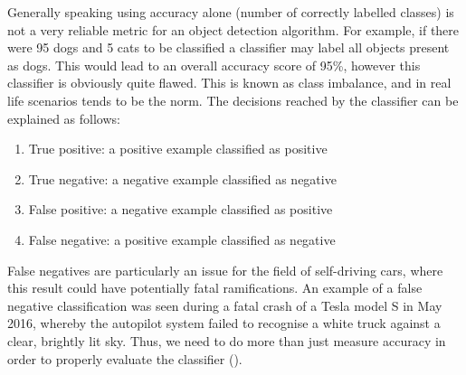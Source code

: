 \documentclass[12pt]{report}
\begin{document}
\begin{flushleft}
Generally speaking using accuracy alone (number of correctly labelled classes) is not a very reliable metric for an object detection algorithm. For example, if there were 95 dogs and 5 cats to be classified a classifier may label all objects present as dogs. This would lead to an overall accuracy score of 95\%, however this classifier is obviously quite flawed. This is known as class imbalance, and in real life scenarios tends to be the norm. The decisions reached by the classifier can be explained as follows:

\begin{enumerate}
  \item True positive: a positive example classified as positive
  \item True negative: a negative example classified as negative
  \item False positive: a negative example classified as positive
  \item False negative: a positive example classified as negative
\end{enumerate}

False negatives are particularly an issue for the field of self-driving cars, where this result could have potentially fatal ramifications. An example of a false negative classification was seen during a fatal crash of a Tesla model S in May 2016, whereby the autopilot system failed to recognise a white truck against a clear, brightly lit sky. Thus, we need to do more than just measure accuracy in order to properly evaluate the classifier (\cite{rogers2016first}).
\end{flushleft}
\end{document}
